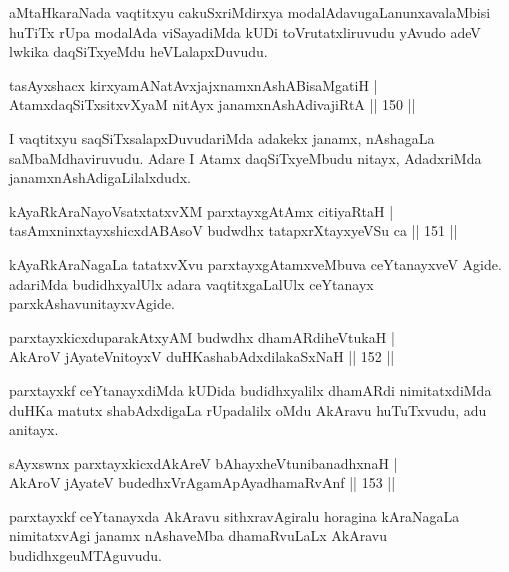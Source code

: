 \begin{artha}
aMtaHkaraNada vaqtitxyu cakuSxriMdirxya modalAdavugaLanunx\break avalaMbisi huTiTx rUpa modalAda viSayadiMda kUDi toVrutatxliruvudu yAvudo adeV lwkika daqSiTxyeMdu heVLalapxDuvudu.
\end{artha}

\begin{shl}
tasAyxshacx kirxyamANatAvxjajxnamxnAshABisaMgatiH |\\
AtamxdaqSiTxsitxvXyaM nitAyx janamxnAshAdivajiRtA \hfill || 150 ||
\end{shl}

\begin{artha}
I vaqtitxyu saqSiTxsalapxDuvudariMda adakekx janamx, nAshagaLa saMbaMdhaviruvudu. Adare I Atamx daqSiTxyeMbudu nitayx, AdadxriMda janamxnAshAdigaLilalxdudx.
\end{artha}

\begin{shl}
kAyaRkAraNayoVsatxtatxvXM parxtayxgAtAmx citiyaRtaH |\\
tasAmxninxtayxshicxdABAsoV budwdhx tatapxrXtayxyeVSu ca \hfill || 151 ||
\end{shl}

\begin{artha}
kAyaRkAraNagaLa tatatxvXvu parxtayxgAtamxveMbuva ceYtanayxveV Agide. adariMda budidhxyalUlx adara vaqtitxgaLalUlx ceYtanayx parxkAshavu\break nitayxvAgide.
\end{artha}

\begin{shl}
parxtayxkicxduparakAtxyAM budwdhx dhamARdiheVtukaH |\\
AkAroV jAyateV\s nitoyxV duHKashabAdxdilakaSxNaH \hfill || 152 ||
\end{shl}

\begin{artha}%
parxtayxkf ceYtanayxdiMda kUDida budidhxyalilx dhamARdi nimitatxdiMda duHKa matutx shabAdxdigaLa rUpadalilx oMdu AkAravu huTuTxvudu, adu anitayx.
\end{artha}

\begin{shl}
sAyxswnx parxtayxkicxdAkAreV bAhayxheVtunibanadhxnaH |\\
AkAroV jAyateV budedhxVrAgamApAyadhamaRvAnf \hfill || 153 ||
\end{shl}

\begin{artha}
parxtayxkf ceYtanayxda AkAravu sithxravAgiralu horagina kAraNagaLa nimitatxvAgi janamx nAshaveMba dhamaRvuLaLx AkAravu budidhxge\break uMTAguvudu.
\end{artha}

